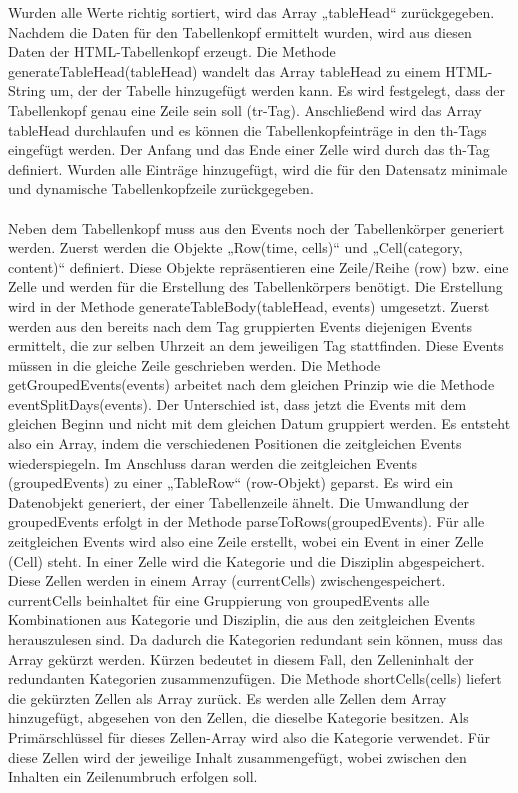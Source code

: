 Wurden alle Werte richtig sortiert, wird das Array „tableHead“ zurückgegeben.
Nachdem die Daten für den Tabellenkopf ermittelt wurden, wird aus diesen Daten der HTML-Tabellenkopf erzeugt. Die Methode generateTableHead(tableHead) wandelt das Array tableHead zu einem HTML-String um, der der Tabelle hinzugefügt werden kann. Es wird festgelegt, dass der Tabellenkopf genau eine Zeile sein soll (tr-Tag). Anschließend wird das Array tableHead durchlaufen und es können die Tabellenkopfeinträge in den th-Tags eingefügt werden. Der Anfang und das Ende einer Zelle wird durch das th-Tag definiert. Wurden alle Einträge hinzugefügt, wird die für den Datensatz minimale und dynamische Tabellenkopfzeile zurückgegeben.\\
\\
Neben dem Tabellenkopf muss aus den Events noch der Tabellenkörper generiert werden. Zuerst werden die Objekte „Row(time, cells)“ und „Cell(category, content)“ definiert. Diese Objekte repräsentieren eine Zeile/Reihe (row) bzw. eine Zelle und werden für die Erstellung des Tabellenkörpers benötigt. 
Die Erstellung wird in der Methode generateTableBody(tableHead, events) umgesetzt. Zuerst werden aus den bereits nach dem Tag gruppierten Events diejenigen Events ermittelt, die zur selben Uhrzeit an dem jeweiligen Tag stattfinden. Diese Events müssen in die gleiche Zeile geschrieben werden. Die Methode getGroupedEvents(events) arbeitet nach dem gleichen Prinzip wie die Methode eventSplitDays(events). Der Unterschied ist, dass jetzt die Events mit dem gleichen Beginn und nicht mit dem gleichen Datum gruppiert werden. Es entsteht also ein Array, indem die verschiedenen Positionen die zeitgleichen Events wiederspiegeln.
Im Anschluss daran werden die zeitgleichen Events (groupedEvents) zu einer „TableRow“ (row-Objekt) geparst. Es wird ein Datenobjekt generiert, der einer Tabellenzeile ähnelt. Die Umwandlung der groupedEvents erfolgt in der Methode parseToRows(groupedEvents). Für alle zeitgleichen Events wird also eine Zeile erstellt, wobei ein Event in einer Zelle (Cell) steht. In einer Zelle wird die Kategorie und die Disziplin abgespeichert. Diese Zellen werden in einem Array (currentCells) zwischengespeichert. currentCells beinhaltet für eine Gruppierung von groupedEvents alle Kombinationen aus Kategorie und Disziplin, die aus den zeitgleichen Events herauszulesen sind. Da dadurch die Kategorien redundant sein können, muss das Array gekürzt werden. Kürzen bedeutet in diesem Fall, den Zelleninhalt der redundanten Kategorien zusammenzufügen.
Die Methode shortCells(cells) liefert die gekürzten Zellen als Array zurück. Es werden alle Zellen dem Array hinzugefügt, abgesehen von den Zellen, die dieselbe Kategorie besitzen. Als Primärschlüssel für dieses Zellen-Array wird also die Kategorie verwendet. Für diese Zellen wird der jeweilige Inhalt zusammengefügt, wobei zwischen den Inhalten ein Zeilenumbruch erfolgen soll. 
